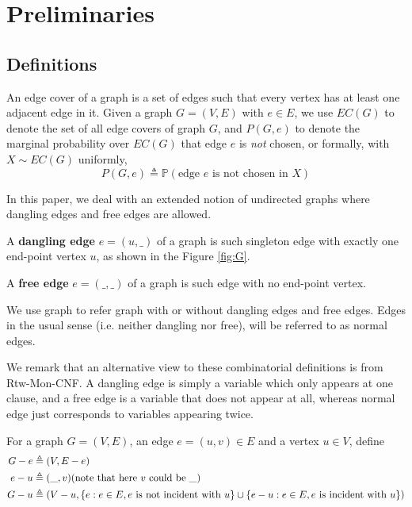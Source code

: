 \section{Preliminaries}
\subsection{Definitions}
An edge cover of a graph is a set of edges such that every vertex has at least one adjacent edge in it.
Given a graph $G=(V,E)$ with $e \in E$,  we use $EC(G)$ to denote the set of all edge covers of graph $G$, and $P(G, e)$ to denote the marginal probability over $EC(G)$ that edge $e$ is \emph{not} chosen, or formally, with $X \sim EC(G)$ uniformly,
\begin{equation}
	P(G, e) \triangleq \mathbb{P} \left(\textrm{edge $e$ is not chosen in $X$} \right)
	\label{defpge}
\end{equation}

In this paper, we deal with an extended notion of undirected graphs where dangling edges and free edges are allowed.
\begin{Def}
	A {\bf dangling edge} $e=(u,\_)$ of a graph is such singleton edge with exactly one end-point vertex $u$, as shown in the Figure \ref{fig:G}.

	A {\bf free edge} $e=(\_, \_)$ of a graph is such edge with no end-point vertex. %


\end{Def}

	We use graph to refer graph with or without dangling edges and free edges.
	Edges in the usual sense (i.e. neither dangling nor free), will be referred to as normal edges.

	We remark that an alternative view to these combinatorial definitions is from Rtw-Mon-CNF.
	A dangling edge is simply a variable which only appears at one clause, and a free edge is a variable
	that does not appear at all, whereas normal edge just corresponds to variables appearing twice.

For a graph $G=(V,E)$, an edge $e = (u,v) \in E$ and a vertex $u \in V$, define
\begin{align*}
G - e &\triangleq (V, E-e) \\
e - u &\triangleq (\_, v) \text{(note that here $v$ could be $\_$)} \\
G - u &\triangleq (V - u, \left\{e: e \in E, e\text{ is not incident with }u\right\} \cup \left\{e - u: e \in E, e\text{ is incident with }u\right\})
\end{align*}

